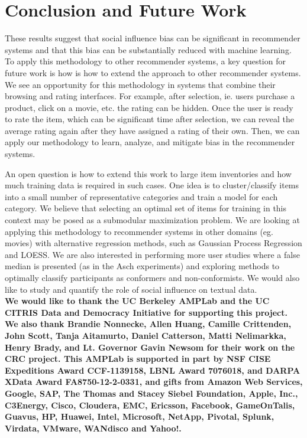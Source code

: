 \section{Conclusion and Future Work}
These results suggest that social influence bias can be significant in
recommender systems and that this bias can be substantially reduced
with machine learning. 
To apply this methodology to other recommender systems, a key question
for future work is how is how to extend the approach to other recommender systems.
We see an opportunity for this methodology in systems that combine their browsing and rating interfaces.
For example, after selection, ie. users purchase a product, click on a movie, etc. the rating can be hidden.
Once the user is ready to rate the item, which can be significant time after selection, we can reveal the average rating again after they have assigned a rating of their own. 
Then, we can apply our methodology to learn, analyze, and mitigate bias in the recommender systems.

An open question is how to extend this work to large item inventories and how much training data is required in such cases.  
One idea is to cluster/classify items into a small number of representative categories and train a model for each category.  
We believe that selecting an optimal set of items for training in this context may be posed as a submodular maximization problem.  
We are looking at applying this methodology to recommender systems in other domains (eg. movies) with alternative regression methods, such as Gaussian Process Regression and LOESS.
We are also interested in performing more user studies where a false median is presented (as in the Asch experiments) and exploring methods to
optimally classify participants as conformers and non-conformists.  
We would also like to study and quantify the role of social influence on textual data.\\[1\baselineskip]
\scriptsize
\textbf{We would like to thank the UC Berkeley AMPLab and the UC CITRIS Data and Democracy Initiative for supporting this project. We also thank Brandie Nonnecke, Allen Huang, Camille Crittenden, John Scott, Tanja Aitamurto, Daniel Catterson, Matti Nelimarkka, Henry Brady, and Lt. Governor Gavin Newsom for their work on the CRC project. This AMPLab is supported in part by NSF CISE Expeditions Award CCF-1139158, LBNL Award 7076018, and DARPA XData Award FA8750-12-2-0331, and  gifts from Amazon Web Services, Google, SAP,  The Thomas and Stacey Siebel Foundation, Apple, Inc., C3Energy, Cisco, Cloudera, EMC, Ericsson, Facebook, GameOnTalis, Guavus, HP, Huawei, Intel, Microsoft, NetApp, Pivotal, Splunk, Virdata, VMware, WANdisco and Yahoo!.}




